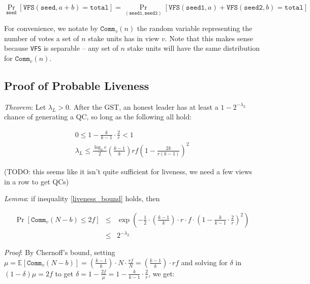 \documentclass[11pt, oneside]{article}       %
\begin{document}
\[
    \Pr_{\texttt{seed}}[\texttt{VFS}(\texttt{seed},a+b) =
    \texttt{total}] = \Pr_{(\texttt{seed1},\texttt{seed2})}[
        \texttt{VFS}(\texttt{seed1},a) + \texttt{VFS}(\texttt{seed2},b) =
    \texttt{total}]
\]

For convenience, we notate by \(\texttt{Comm}_v(n)\) the random variable representing
the number of votes a set of \(n\) stake units has in view \(v\). Note that this makes
sense because \texttt{VFS} is separable -- any set of \(n\) stake units
will have the same distribution for \(\texttt{Comm}_v(n)\).

\subsection*{Proof of Probable Liveness}

\emph{Theorem}: Let \(\lambda_L > 0\). After the GST, an honest leader has at least a \(1 -
2^{-\lambda_L}\) chance of generating a QC, so long as the following all
hold:

\begin{equation}\label{liveness_bound}
    \begin{array}{c}
        0 \leq 1 - \frac{k}{k-1}\cdot\frac{2}{r} < 1 \\

        \lambda_L \leq \frac{\log_2 e}{2} \left(\frac{k-1}{k}\right) r f \left(1 -
        \frac{2k}{r(k-1)}\right)^2
    \end{array}
\end{equation}

(TODO: this seems like it isn't quite sufficient for liveness, we need a
few views in a row to get QCs)

\emph{Lemma}: if inequality \eqref{liveness_bound} holds, then

\[
\begin{array}{rcl}
    \Pr[\texttt{Comm}_v(N-b) \leq 2f] & \leq & \exp\left(
        -\frac{1}{2} \cdot
         \left(\frac{k-1}{k}\right)
         \cdot r\cdot f \cdot
         \left(1-\frac{k}{k-1}\cdot \frac{2}{r}\right)^2
    \right)
    \\
    &\leq&2^{-\lambda_L}
\end{array}
\]

\emph{Proof}: By Chernoff's bound, setting \(\mu =
\mathbb{E}[\texttt{Comm}_v(N-b)] = \left(\frac{k-1}{k}\right) \cdot N \cdot
\frac{rf}{N} = \left(\frac{k-1}{k}\right)\cdot rf\) and solving for
\(\delta\) in \((1-\delta)\mu = 2f\) to get \(\delta = 1 - \frac{2f}{\mu} =
1 - \frac{k}{k-1}\cdot \frac{2}{r}\), we get:
\end{document}
